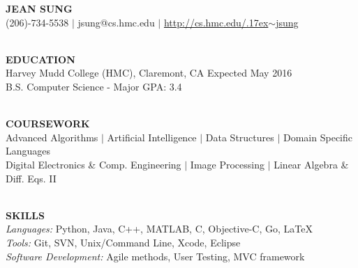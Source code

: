 \documentclass[11.5pt]{article}
\makeatletter
\newcommand{\selfName}{\textbf{\fontsize{30}{30}\selectfont JEAN SUNG }}
\newcommand{\email}{\large {jsung@cs.hmc.edu }}
\newcommand{\phone}{\large (206)-734-5538 }
\newcommand{\tildeText}{\raise.17ex\hbox{$\scriptstyle\sim$}}
\newcommand{\websitedisplaytext}{\large http://cs.hmc.edu/\tildeText jsung }
\newcommand{\website}{\href{http://cs.hmc.edu/~jsung}{\websitedisplaytext}}
\newcommand{\wrapTitle}[1]{{\sectionNL \textbf{\Large #1}} \sectionNL}
\newcommand{\vb}{ $\mid$ }
\newcommand{\sectionNL}{~\\[1pt]}
\newcommand{\HMC}{HMC}
\newcommand{\rightAlign}{\hfill}
\makeatother
\begin{document}
\begin{center}
\selfName\\
\phone  
\vb\email 
\vb\website \\
\hrulefill
\end{center}



\begin{flushleft}
\wrapTitle{EDUCATION}
Harvey Mudd College (\HMC), Claremont, CA \rightAlign Expected May 2016  \\
B.S. Computer Science - Major GPA: 3.4   \\
\end{flushleft}


\begin{flushleft}
\wrapTitle{COURSEWORK}
Advanced Algorithms 
\vb Artificial Intelligence 
\vb Data Structures 
\vb Domain Specific Languages\\
Digital Electronics \& Comp. Engineering
\vb Image Processing  
\vb Linear Algebra \& Diff. Eqs. II


\end{flushleft}


\begin{flushleft}
\wrapTitle{SKILLS}
\textit{Languages:} Python, Java, C++, MATLAB, C, Objective-C, Go, \LaTeX \\
\textit{Tools:} Git, SVN, Unix/Command Line, Xcode, Eclipse \\ %
\textit{Software Development:} Agile methods, User Testing, MVC framework

\end{flushleft}
\end{document}
